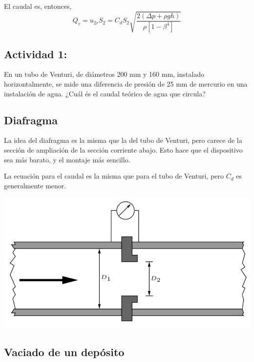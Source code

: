	El caudal es, entonces, 
	\[
	Q_{r}=u_{2r}S_{2}=C_{d}S_{2}\sqrt{\frac{2\left(\Delta p+\rho gh\right)}{\rho\left[1-\beta^{4}\right]}}
	\]
	
	\subsection*{Actividad 1:}
		En un tubo de Venturi, de diámetros 200 mm y 160 mm, instalado horizontalmente,
		se mide una diferencia de presión de 25 mm de mercurio en una instalación
		de agua. ¿Cuál és el caudal teórico de agua que circula?

\subsection{Diafragma}
	
	La idea del diafragma es la misma que la del tubo de Venturi, pero
	carece de la sección de ampliación de la sección corriente abajo.
	Esto hace que el dispositivo sea más barato, y el montaje más sencillo.
	
	La ecuación para el caudal es la misma que para el tubo de Venturi,
	pero $C_{d}$ es generalmente menor. 
	
\begin{center}
	\includegraphics[width=0.7\linewidth]{TeX_files/chapter04-Dinamica/diafragma}
\end{center}

	


\subsection{Vaciado de un depósito}
	
